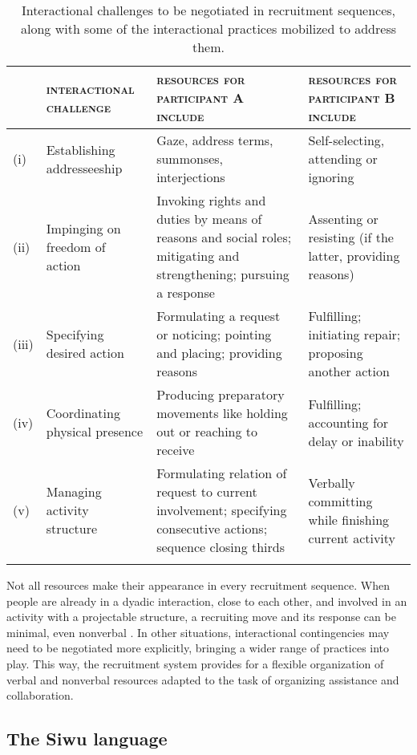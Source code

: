 \documentclass[output=paper]{langsci/langscibook}
\begin{document}
\begin{table}[t]
\small
\begin{tabularx}{\textwidth}{lQQQ}
\lsptoprule
& \textsc{interactional challenge} & \textsc{resources for participant A include} & \textsc{resources for participant B include}\\
\midrule
(i) & Establishing addresseeship & Gaze, address terms, summonses, interjections & Self-selecting, attending or ignoring\\
(ii) & Impinging on freedom of action & Invoking rights and duties by means of reasons and social roles; mitigating and strengthening; pursuing a response & Assenting or resisting (if the latter, providing reasons)\\
(iii) & Specifying desired action & Formulating a request or noticing; pointing and placing; providing reasons & Fulfilling; initiating repair; proposing another action\\
(iv) & Coordinating physical presence & Producing preparatory movements like holding out or reaching to receive & Fulfilling; accounting for delay or inability\\
(v) & Managing activity structure & Formulating relation of request to current involvement; specifying consecutive actions; sequence closing thirds & Verbally committing while finishing current activity\\
\lspbottomrule
\end{tabularx}
\caption{Interactional challenges to be negotiated in recruitment sequences, along with some of the interactional practices mobilized to address them.}
\label{tab:dingemanse:1}
\end{table}

Not all resources make their appearance in every recruitment sequence. When people are already in a dyadic interaction, close to each other, and involved in an activity with a projectable structure, a recruiting move and its response can be minimal, even nonverbal \citep{Rossi2014}. In other situations, interactional contingencies may need to be negotiated more explicitly, bringing a wider range of practices into play. This way, the recruitment system provides for a flexible organization of verbal and nonverbal resources adapted to the task of organizing assistance and collaboration.

\subsection{The Siwu language}
\end{document}
